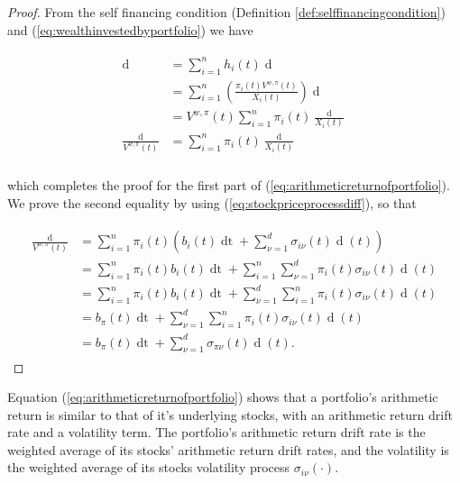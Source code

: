 \documentclass[british]{amsart} \usepackage{lmodern}
\numberwithin{equation}{section} \numberwithin{figure}{section}
\theoremstyle{plain} \newtheorem{thm}{\protect\theoremname}[section]
\theoremstyle{definition} \newtheorem{defn}[thm]{\protect\definitionname}
\theoremstyle{plain} \newtheorem{assumption}[thm]{\protect\assumptionname}
\theoremstyle{plain} \newtheorem{lem}[thm]{\protect\lemmaname}
\theoremstyle{plain} \newtheorem{prop}[thm]{\protect\propositionname}
\theoremstyle{remark} \newtheorem{rem}[thm]{\protect\remarkname}
\theoremstyle{plain} \newtheorem{cor}[thm]{\protect\corollaryname}
\renewcommand{\d}[1]{\mathop{\mathrm{d}{#1}}}
\begin{document}
\begin{proof}

  From the self financing condition (Definition \ref{def:selffinancingcondition}) 
  and (\ref{eq:wealthinvestedbyportfolio}) we have

  \begin{gather*}
    \begin{split}
      \d{V^{w,\pi}(t)} 
      &= \sum_{i=1}^{n} h_{i}(t) \d{X_{i}(t)} \\
      &= \sum_{i=1}^{n} \left(  \frac{\pi_{i}(t)V^{w,\pi}(t)}{X_{i}(t)} \right) \d{X_{i}(t)} \\
      &= V^{w,\pi}(t) \sum_{i=1}^{n} \pi_{i}(t) \frac{\d{X_{i}(t)}}{X_{i}(t)} \\
      \frac{\d{V^{w,\pi}(t)}}{V^{w,\pi}(t)} 
      &= \sum_{i=1}^{n} \pi_{i}(t) \frac{\d{X_{i}(t)}}{X_{i}(t)} \\
    \end{split}
  \end{gather*}

   which completes the proof for the first part of (\ref{eq:arithmeticreturnofportfolio}). 
  We prove the second equality by using (\ref{eq:stockpriceprocessdiff}), so that
  
  \begin{gather*}
    \begin{split}
      \frac{\d{V^{w,\pi}(t)}}{V^{w,\pi}(t)}
          & = \sum_{i=1}^{n} \pi_{i}(t) 
          \left(
            b_{i}(t)\d{t} + \sum_{\nu=1}^{d} \sigma_{i\nu}(t) \d{W_{\nu}}(t)
          \right) \\
          & = \sum_{i=1}^{n} \pi_{i}(t) b_{i}(t)\d{t} + 
              \sum_{i=1}^{n} \sum_{\nu=1}^{d} \pi_{i}(t) \sigma_{i\nu}(t) \d{W_{\nu}}(t) \\
          & = \sum_{i=1}^{n} \pi_{i}(t) b_{i}(t)\d{t} + 
              \sum_{\nu=1}^{d} \sum_{i=1}^{n} \pi_{i}(t) \sigma_{i\nu}(t) \d{W_{\nu}}(t) \\
          & = b_{\pi}(t)\d{t} + 
              \sum_{\nu=1}^{d} \sum_{i=1}^{n} \pi_{i}(t) \sigma_{i\nu}(t) \d{W_{\nu}}(t) \\
          & = b_{\pi}(t)\d{t} + 
              \sum_{\nu=1}^{d} \sigma_{\pi\nu}(t) \d{W_{\nu}}(t).
    \end{split}
  \end{gather*}

\end{proof}

Equation (\ref{eq:arithmeticreturnofportfolio}) shows that a portfolio's
arithmetic return is similar to that of it's underlying stocks, with an 
arithmetic return drift rate and a volatility term. The portfolio's arithmetic
return drift rate is the weighted average of its stocks' arithmetic return drift
rates, and the volatility is the weighted average of its stocks volatility
process $\sigma_{i\nu}(\cdot)$.
\end{document}
